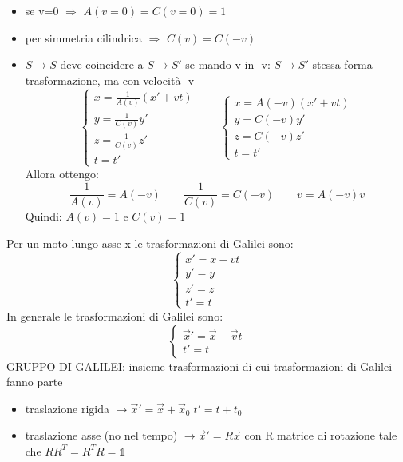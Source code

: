 \begin{itemize}
    \item se v=0 $\Rightarrow$ $A(v=0)=C(v=0)=1$
    \item per simmetria cilindrica $\Rightarrow$ $C(v)=C(-v)$
    \item $S \rightarrow S$ deve coincidere a $S \rightarrow S'$ se mando v in -v: $S \rightarrow S'$ stessa forma trasformazione, ma con velocità -v \newline
    \begin{equation*}\begin{cases}
        x = \frac{1}{A(v)}(x'+vt) \\
        y = \frac{1}{C(v)}y' \\
        z = \frac{1}{C(v)}z' \\
        t = t'
    \end{cases} \qquad 
    \begin{cases}
        x = A(-v)(x' +vt) \\
        y = C(-v)y' \\
        z = C(-v)z' \\
        t = t'
    \end{cases}
\end{equation*}
Allora ottengo:
\begin{equation*}
    \frac{1}{A(v)}= A(-v) \qquad \frac{1}{C(v)}= C(-v) \qquad v = A(-v)v
\end{equation*}
Quindi: $A(v)=1 $ e $C(v)=1$
\end{itemize}
Per un moto lungo asse x le trasformazioni di Galilei sono:
\begin{equation*}
    \begin{cases}
        x' = x -vt \\
        y' = y \\
        z' = z \\
        t' = t
    \end{cases}
\end{equation*}
In generale le trasformazioni di Galilei sono:
\begin{equation*}
    \begin{cases}
        \vec{x}' = \vec{x} - \vec{v}t \\
        t'=t
    \end{cases}
\end{equation*}
GRUPPO DI GALILEI: insieme trasformazioni di cui trasformazioni di Galilei fanno parte
\begin{itemize}
    \item traslazione rigida $\rightarrow \vec{x}' = \vec{x} + \vec{x}_0 \; t'=t + t_0$
    \item traslazione asse (no nel tempo) $\rightarrow \vec{x}' = R\vec{x}$ con R matrice di rotazione tale che $RR^T = R^TR = \mathbb{1}$
\end{itemize}